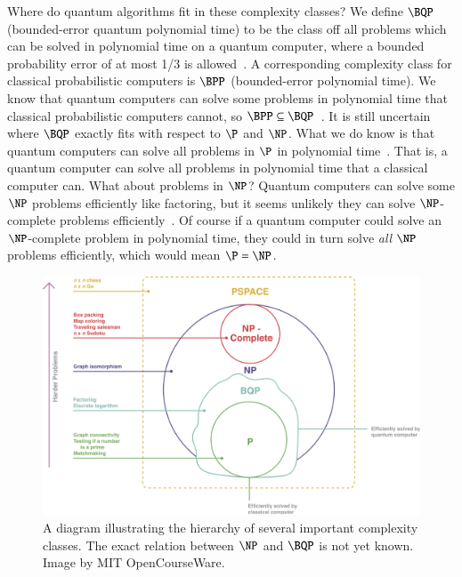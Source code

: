 \documentclass[twocolumn, switch]{article}
\begin{document}
    Where do quantum algorithms fit in these complexity classes?
    We define $\BQP$ (bounded-error quantum polynomial time) to be the class off all problems which can be solved in polynomial time on a quantum computer, where a bounded probability error of at most 1/3 is allowed~\cite{nielsen-chuang}.
    A corresponding complexity class for classical probabilistic computers is $\BPP$ (bounded-error polynomial time).
    We know that quantum computers can solve some problems in polynomial time that classical probabilistic computers cannot, so $\BPP \subseteq \BQP$~\cite{bernstein1997quantum}.
    It is still uncertain where $\BQP$ exactly fits with respect to $\P$ and $\NP$.
    What we do know is that quantum computers can solve all problems in $\P$ in polynomial time~\cite{bennett1973logical}.
    That is, a quantum computer can solve all problems in polynomial time that a classical computer can.
    What about problems in $\NP$?
    Quantum computers can solve some $\NP$ problems efficiently like factoring, but it seems unlikely they can solve $\NP$-complete problems efficiently~\cite{aaronson2010bqp}.
    Of course if a quantum computer could solve an $\NP$-complete problem in polynomial time, they could in turn solve \emph{all} $\NP$ problems efficiently, which would mean $\P = \NP$.
    
    \begin{figure}[ht]
        \centering
        \includegraphics[width=.9\linewidth]{figures/complexity_hierarchy.pdf}
        \caption{A diagram illustrating the hierarchy of several important complexity classes. The exact relation between $\NP$ and $\BQP$ is not yet known. Image by MIT OpenCourseWare.}
    \end{figure}
\end{document}
